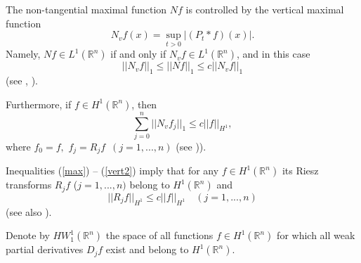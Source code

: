 \documentclass[12pt,twoside,reqno]{amsart}
\numberwithin{equation}{section}
\theoremstyle{definition}
\numberwithin{equation}{section}
\def\R{\mathbb{R}}
\begin{document}
The non-tangential maximal function $Nf$ is controlled by the vertical maximal function
$$
N_vf(x)=\sup_{t>0}|(P_t\ast f)(x)|.
$$
Namely, $Nf\in L^1(\R^n)$ if and only if $N_vf\in L^1(\R^n)$, and in this case
\begin{equation}\label{vert}
||N_vf||_1\le ||Nf||_1\le c||N_vf||_1
\end{equation}
(see  \cite[p.170]{FS}, \cite[Th. 6.4.4]{Graf}).

Furthermore, if $f\in H^1(\R^n)$, then
\begin{equation}\label{vert2}
\sum_{j=0}^n||N_vf_j||_1\le c||f||_{H^1},
\end{equation}
where $f_0=f,$ $f_j=R_jf\,\,\,(j=1,...,n)$ (see \cite[Ch. VII.3.2]{St})).

Inequalities (\ref{max}) -- (\ref{vert2}) imply that for any $f\in H^1(\R^n)$ its Riesz transforms $R_jf$ ($j=1,...,n)$ belong to $H^1(\R^n)$ and
\begin{equation}\label{riesz}
||R_j f||_{H^1}\le c ||f||_{H^1}\quad(j=1,...,n)
\end{equation}
(see also \cite[pp.  288,  322]{GR}).

Denote by $HW_1^1(\R^n)$ the space of all functions $f\in H^1(\R^n)$ for which all weak partial derivatives
$D_jf$ exist and belong to $H^1(\R^n)$.
\end{document}
